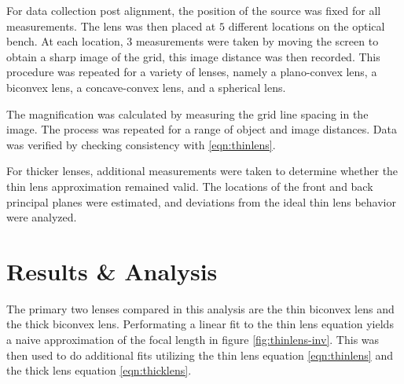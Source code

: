 \documentclass[aip, cp, amsmath, amssymb, reprint, nofootinbib]{revtex4-2}
\begin{document}

        For data collection post alignment, the position of the source was fixed for all measurements. The lens was then placed at $5$ different locations on the optical bench. At each location, $3$ measurements were taken by moving the screen to obtain a sharp image of the grid, this image distance was then recorded. This procedure was repeated for a variety of lenses, namely a plano-convex lens, a biconvex lens, a concave-convex lens, and a spherical lens. 
        
        The magnification was calculated by measuring the grid line spacing in the image. The process was repeated for a range of object and image distances. Data was verified by checking consistency with \eqref{eqn:thinlens}.

        For thicker lenses, additional measurements were taken to determine whether the thin lens approximation remained valid. The locations of the front and back principal planes were estimated, and deviations from the ideal thin lens behavior were analyzed.

    \section{Results \& Analysis}
            The primary two lenses compared in this analysis are the thin biconvex lens and the thick biconvex lens. Performating a linear fit to the thin lens equation yields a naive approximation of the focal length in figure \ref{fig:thinlens-inv}. This was then used to do additional fits utilizing the thin lens equation \eqref{eqn:thinlens} and the thick lens equation \eqref{eqn:thicklens}. 
\end{document}
